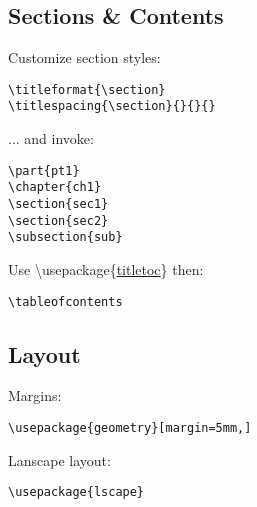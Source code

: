 \subsection*{Sections \& Contents}
\begin{minipage}{6.5cm}
Customize section styles: 
\begin{lstlisting}
\titleformat{\section}
\titlespacing{\section}{}{}{}
\end{lstlisting} 
... and invoke:
\begin{lstlisting}
\part{pt1}
\chapter{ch1}
\section{sec1}
\section{sec2}
\subsection{sub}
\end{lstlisting} 
Use \textbackslash usepackage\{\href{http://mirrors.ctan.org/macros/latex/contrib/titlesec/titlesec.pdf}{titletoc}\} then: 
\begin{lstlisting}
\tableofcontents
\end{lstlisting}
\end{minipage}

\subsection*{Layout}

\begin{minipage}{6cm}
Margins:
\begin{lstlisting}
\usepackage{geometry}[margin=5mm,]
\end{lstlisting}
Lanscape layout:
\begin{lstlisting}
\usepackage{lscape}
\end{lstlisting}
\end{minipage}

